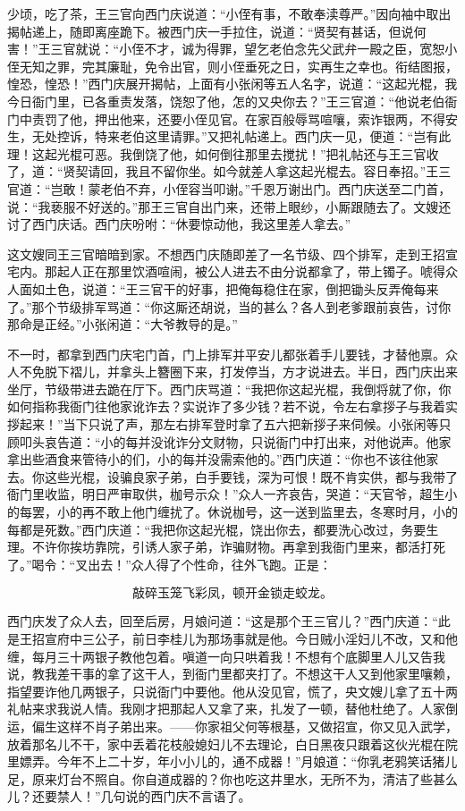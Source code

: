 少顷，吃了茶，王三官向西门庆说道：“小侄有事，不敢奉渎尊严。”因向袖中取出揭帖递上，随即离座跪下。被西门庆一手拉住，说道：“贤契有甚话，但说何害！”王三官就说：“小侄不才，诚为得罪，望乞老伯念先父武弁一殿之臣，宽恕小侄无知之罪，完其廉耻，免令出官，则小侄垂死之日，实再生之幸也。衔结图报，惶恐，惶恐！”西门庆展开揭帖，上面有小张闲等五人名字，说道：“这起光棍，我今日衙门里，已各重责发落，饶恕了他，怎的又央你去？”王三官道：“他说老伯衙门中责罚了他，押出他来，还要小侄见官。在家百般辱骂喧嚷，索诈银两，不得安生，无处控诉，特来老伯这里请罪。”又把礼帖递上。西门庆一见，便道：“岂有此理！这起光棍可恶。我倒饶了他，如何倒往那里去搅扰！”把礼帖还与王三官收了，道：“贤契请回，我且不留你坐。如今就差人拿这起光棍去。容日奉招。”王三官道：“岂敢！蒙老伯不弃，小侄容当叩谢。”千恩万谢出门。西门庆送至二门首，说：“我亵服不好送的。”那王三官自出门来，还带上眼纱，小厮跟随去了。文嫂还讨了西门庆话。西门庆吩咐：“休要惊动他，我这里差人拿去。”

这文嫂同王三官暗暗到家。不想西门庆随即差了一名节级、四个排军，走到王招宣宅内。那起人正在那里饮酒喧闹，被公人进去不由分说都拿了，带上镯子。唬得众人面如土色，说道：“王三官干的好事，把俺每稳住在家，倒把锄头反弄俺每来了。”那个节级排军骂道：“你这厮还胡说，当的甚么？各人到老爹跟前哀告，讨你那命是正经。”小张闲道：“大爷教导的是。”

不一时，都拿到西门庆宅门首，门上排军并平安儿都张着手儿要钱，才替他禀。众人不免脱下褶儿，并拿头上簪圈下来，打发停当，方才说进去。半日，西门庆出来坐厅，节级带进去跪在厅下。西门庆骂道：“我把你这起光棍，我倒将就了你，你如何指称我衙门往他家讹诈去？实说诈了多少钱？若不说，令左右拿拶子与我着实拶起来！”当下只说了声，那左右排军登时拿了五六把新拶子来伺候。小张闲等只顾叩头哀告道：“小的每并没讹诈分文财物，只说衙门中打出来，对他说声。他家拿出些酒食来管待小的们，小的每并没需索他的。”西门庆道：“你也不该往他家去。你这些光棍，设骗良家子弟，白手要钱，深为可恨！既不肯实供，都与我带了衙门里收监，明日严审取供，枷号示众！”众人一齐哀告，哭道：“天官爷，超生小的每罢，小的再不敢上他门缠扰了。休说枷号，这一送到监里去，冬寒时月，小的每都是死数。”西门庆道：“我把你这起光棍，饶出你去，都要洗心改过，务要生理。不许你挨坊靠院，引诱人家子弟，诈骗财物。再拿到我衙门里来，都活打死了。”喝令：“叉出去！”众人得了个性命，往外飞跑。正是：

\[
敲碎玉笼飞彩凤，顿开金锁走蛟龙。
\]

西门庆发了众人去，回至后房，月娘问道：“这是那个王三官儿？”西门庆道：“此是王招宣府中三公子，前日李桂儿为那场事就是他。今日贼小淫妇儿不改，又和他缠，每月三十两银子教他包着。嗔道一向只哄着我！不想有个底脚里人儿又告我说，教我差干事的拿了这干人，到衙门里都夹打了。不想这干人又到他家里嚷赖，指望要诈他几两银子，只说衙门中要他。他从没见官，慌了，央文嫂儿拿了五十两礼帖来求我说人情。我刚才把那起人又拿了来，扎发了一顿，替他杜绝了。人家倒运，偏生这样不肖子弟出来。——你家祖父何等根基，又做招宣，你又见入武学，放着那名儿不干，家中丢着花枝般媳妇儿不去理论，白日黑夜只跟着这伙光棍在院里嫖弄。今年不上二十岁，年小小儿的，通不成器！”月娘道：“你乳老鸦笑话猪儿足，原来灯台不照自。你自道成器的？你也吃这井里水，无所不为，清洁了些甚么儿？还要禁人！”几句说的西门庆不言语了。

